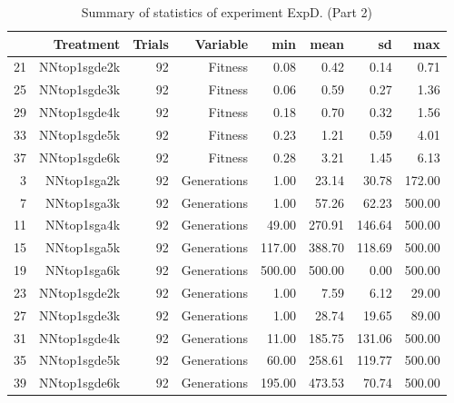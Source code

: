 \begin{table}[ht]
\centering
\begin{tabular}{rrrrrrrr}
  \hline
 & Treatment & Trials & Variable & min & mean & sd & max \\ 
  \hline
21 & NNtop1sgde2k &  92 & Fitness & 0.08 & 0.42 & 0.14 & 0.71 \\ 
  25 & NNtop1sgde3k &  92 & Fitness & 0.06 & 0.59 & 0.27 & 1.36 \\ 
  29 & NNtop1sgde4k &  92 & Fitness & 0.18 & 0.70 & 0.32 & 1.56 \\ 
  33 & NNtop1sgde5k &  92 & Fitness & 0.23 & 1.21 & 0.59 & 4.01 \\ 
  37 & NNtop1sgde6k &  92 & Fitness & 0.28 & 3.21 & 1.45 & 6.13 \\ 
  3 & NNtop1sga2k &  92 & Generations & 1.00 & 23.14 & 30.78 & 172.00 \\ 
  7 & NNtop1sga3k &  92 & Generations & 1.00 & 57.26 & 62.23 & 500.00 \\ 
  11 & NNtop1sga4k &  92 & Generations & 49.00 & 270.91 & 146.64 & 500.00 \\ 
  15 & NNtop1sga5k &  92 & Generations & 117.00 & 388.70 & 118.69 & 500.00 \\ 
  19 & NNtop1sga6k &  92 & Generations & 500.00 & 500.00 & 0.00 & 500.00 \\ 
  23 & NNtop1sgde2k &  92 & Generations & 1.00 & 7.59 & 6.12 & 29.00 \\ 
  27 & NNtop1sgde3k &  92 & Generations & 1.00 & 28.74 & 19.65 & 89.00 \\ 
  31 & NNtop1sgde4k &  92 & Generations & 11.00 & 185.75 & 131.06 & 500.00 \\ 
  35 & NNtop1sgde5k &  92 & Generations & 60.00 & 258.61 & 119.77 & 500.00 \\ 
  39 & NNtop1sgde6k &  92 & Generations & 195.00 & 473.53 & 70.74 & 500.00 \\ 
   \hline
\end{tabular}
\caption{Summary of statistics of experiment ExpD. (Part 2)} 
\end{table}

